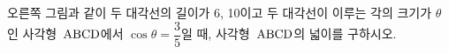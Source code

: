 \noindent\begin{minipage}[t]{0.58\linewidth}\vspace{0pt}\raggedright 오른쪽 그림과 같이 두 대각선의 길이가 6, 10이고 두 대각선이 이루는 각의 크기가 $\theta$인 사각형~$\mathrm{ABCD}$에서 $\cos\theta=\dfrac{3}{5}$일 때, 사각형~$\mathrm{ABCD}$의 넓이를 구하시오.\end{minipage}\hfill\begin{minipage}[t]{0.4\linewidth}\vspace{0pt}\centering \resizebox{\ifdim\width>\linewidth\linewidth\else\width\fi}{!}{}\end{minipage}\par
